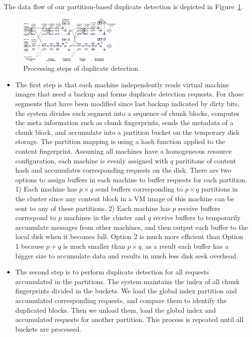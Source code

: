 The data flow of our partition-based  duplicate detection is depicted in
Figure~\ref{fig:flow}. 
\begin{figure}
\centering
\includegraphics[width=0.45\textwidth]{steps.pdf}
\caption{ Processing steps of duplicate detection.}
\label{fig:flow}
\end{figure}

\begin{itemize}
\item
The first step is that each machine independently reads  
virtual machine images that need a backup
and forms duplicate  detection requests. For those segments that have been modified since last backup indicated by 
dirty bits,  the system divides  each segment into a sequence of chunk blocks,  computes the meta 
information such as chunk fingerprints,  sends the metadata of a chunk block, and accumulate  into 
a partition bucket on the temporary disk storage. 
The partition mapping is using a hash function applied to the content fingerprint. 
Assuming all machines have a  homogeneous resource configuration, each machine is evenly  assigned with
$q$ parititons of content hash and accumulates corresponding requests on the disk. 
There are two options to assign buffers in each machine to buffer requests for each partition.
1) Each machine has  $p\times q$ send buffers corresponding to $p\times q$ partitions in the cluster
since any content block in a VM image of this machine can be sent to any of these partitions.
2) Each machine has $p$ receive buffers correspond to $p$ machines in the cluster and $q$ receive 
buffers to temporarily accumulate messages from other machines, and then output each buffer to the local disk
when it becomes full.  Option 2 is much more efficient than Option 1 because $p+q$ is much smaller than
$p\times q$, as a result each buffer has a bigger size to accumulate data and results in 
much less disk seek overhead.

\item
The second step is to perform duplicate detection for  all requests accumulated in the partitions.  
The system maintains the index of all chunk fingerprints divided in the buckets. We load the global index partition 
and accumulated corresponding requests, and compare them to  identify the duplicated blocks.  
Then we unload them, load the global index and accumulated requests for another partition. 
This process is repeated until all buckets are processed.


\end{itemize}

